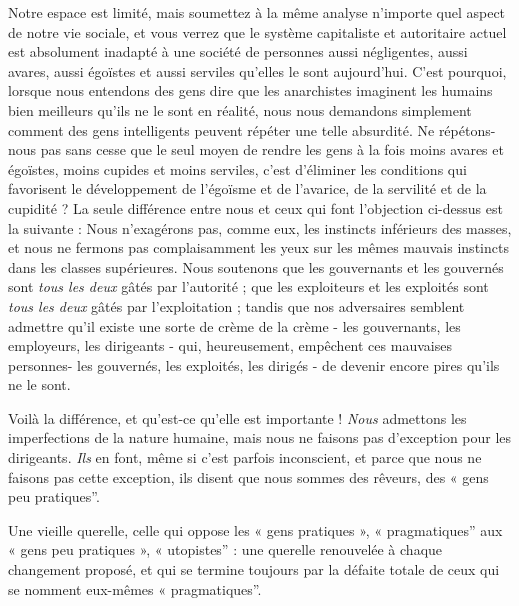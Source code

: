 Notre espace est limité, mais soumettez à la même analyse n'importe quel aspect de notre vie sociale, et vous verrez que le système capitaliste et autoritaire actuel est absolument inadapté à une société de personnes aussi négligentes, aussi avares, aussi égoïstes et aussi serviles qu'elles le sont aujourd'hui. C'est pourquoi, lorsque nous entendons des gens dire que les anarchistes imaginent les humains bien meilleurs qu'ils ne le sont en réalité, nous nous demandons simplement comment des gens intelligents peuvent répéter une telle absurdité. Ne répétons-nous pas sans cesse que le seul moyen de rendre les gens à la fois moins avares et égoïstes, moins cupides et moins serviles, c'est d'éliminer les conditions qui favorisent le développement de l'égoïsme et de l’avarice, de la servilité et de la cupidité ? La seule différence entre nous et ceux qui font l'objection ci-dessus est la suivante : Nous n'exagérons pas, comme eux, les instincts inférieurs des masses, et nous ne fermons pas complaisamment les yeux sur les mêmes mauvais instincts dans les classes supérieures. Nous soutenons que les gouvernants et les gouvernés sont \emph{tous les deux} gâtés par l'autorité ; que les exploiteurs et les exploités sont \emph{tous les deux} gâtés par l'exploitation ; tandis que nos adversaires semblent admettre qu'il existe une sorte de crème de la crème - les gouvernants, les employeurs, les dirigeants - qui, heureusement, empêchent ces mauvaises personnes- les gouvernés, les exploités, les dirigés - de devenir encore pires qu'ils ne le sont.

Voilà la différence, et qu’est-ce qu’elle est importante ! \emph{Nous} admettons les imperfections de la nature humaine, mais nous ne faisons pas d'exception pour les dirigeants. \emph{Ils} en font, même si c'est parfois inconscient, et parce que nous ne faisons pas cette exception, ils disent que nous sommes des rêveurs, des « gens peu pratiques''.

Une vieille querelle, celle qui oppose les « gens pratiques », « pragmatiques'' aux « gens peu pratiques », « utopistes'' : une querelle renouvelée à chaque changement proposé, et qui se termine toujours par la défaite totale de ceux qui se nomment eux-mêmes « pragmatiques''.

